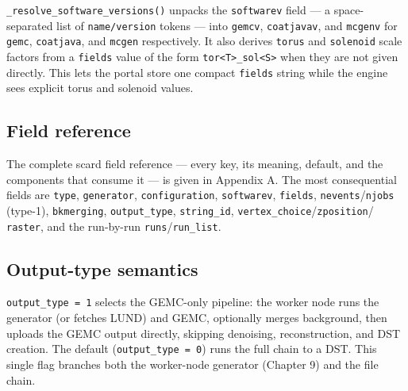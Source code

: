 \texttt{\_\allowbreak{}resolve\_\allowbreak{}software\_\allowbreak{}versions()} unpacks the \texttt{softwarev}
field --- a space-separated list of \texttt{name/\allowbreak{}version} tokens --- into \texttt{gemcv},
\texttt{coatjavav}, and \texttt{mcgenv} for \texttt{gemc}, \texttt{coatjava}, and \texttt{mcgen} respectively.
It also derives \texttt{torus} and \texttt{solenoid} scale factors from a \texttt{fields} value of the form
\texttt{tor<T>\_\allowbreak{}sol<S>} when they are not given directly. This lets the portal store one compact
\texttt{fields} string while the engine sees explicit torus and solenoid values.

\subsection{Field reference}

The complete scard field reference --- every key, its meaning, default, and the components that consume it ---
is given in Appendix A. The most consequential fields are \texttt{type}, \texttt{generator},
\texttt{configuration}, \texttt{softwarev}, \texttt{fields}, \texttt{nevents}/\texttt{njobs} (type-1),
\texttt{bkmerging}, \texttt{output\_\allowbreak{}type}, \texttt{string\_\allowbreak{}id},
\texttt{vertex\_\allowbreak{}choice}/\texttt{zposition}/ \texttt{raster}, and the run-by-run
\texttt{runs}/\texttt{run\_\allowbreak{}list}.

\subsection{Output-type semantics}

\texttt{output\_\allowbreak{}type =\allowbreak{} 1} selects the GEMC-only pipeline: the worker node runs the
generator (or fetches LUND) and GEMC, optionally merges background, then uploads the GEMC output directly,
skipping denoising, reconstruction, and DST creation. The default (\texttt{output\_\allowbreak{}type
=\allowbreak{} 0}) runs the full chain to a DST. This single flag branches both the worker-node generator
(Chapter 9) and the file chain.
